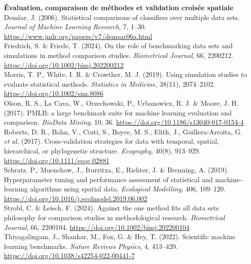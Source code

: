 \documentclass[11pt,a4paper]{article}
\begin{document}
{\textbf{Évaluation, comparaison de méthodes et validation croisée spatiale}\\[0.15cm]

Demšar, J. (2006). Statistical comparisons of classifiers over multiple data sets. \textit{Journal of Machine Learning Research}, 7, 1--30. \url{https://www.jmlr.org/papers/v7/demsar06a.html}\\[0.2cm]

Friedrich, S. \& Friede, T. (2024). On the role of benchmarking data sets and simulations in method comparison studies. \textit{Biometrical Journal}, 66, 2200212. \url{https://doi.org/10.1002/bimj.202200212}\\[0.2cm]

Morris, T. P., White, I. R. \& Crowther, M. J. (2019). Using simulation studies to evaluate statistical methods. \textit{Statistics in Medicine}, 38(11), 2074--2102. \url{https://doi.org/10.1002/sim.8086}\\[0.2cm]

Olson, R. S., La Cava, W., Orzechowski, P., Urbanowicz, R. J. \& Moore, J. H. (2017). PMLB: a large benchmark suite for machine learning evaluation and comparison. \textit{BioData Mining}, 10, 36. \url{https://doi.org/10.1186/s13040-017-0154-4}\\[0.2cm]

Roberts, D. R., Bahn, V., Ciuti, S., Boyce, M. S., Elith, J., Guillera-Arroita, G. \textit{et al.} (2017). Cross-validation strategies for data with temporal, spatial, hierarchical, or phylogenetic structure. \textit{Ecography}, 40(8), 913--929. \url{https://doi.org/10.1111/ecog.02881}\\[0.2cm]

Schratz, P., Muenchow, J., Iturritxa, E., Richter, J. \& Brenning, A. (2019). Hyperparameter tuning and performance assessment of statistical and machine-learning algorithms using spatial data. \textit{Ecological Modelling}, 406, 109--120. \url{https://doi.org/10.1016/j.ecolmodel.2019.06.002}\\[0.2cm]

Strobl, C. \& Leisch, F. (2024). Against the one method fits all data sets philosophy for comparison studies in methodological research. \textit{Biometrical Journal}, 66, 2200104. \url{https://doi.org/10.1002/bimj.202200104}\\[0.2cm]

Thiyagalingam, J., Shankar, M., Fox, G. \& Hey, T. (2022). Scientific machine learning benchmarks. \textit{Nature Reviews Physics}, 4, 413--420. \url{https://doi.org/10.1038/s42254-022-00441-7}\\[0.2cm]

}
\end{document}
